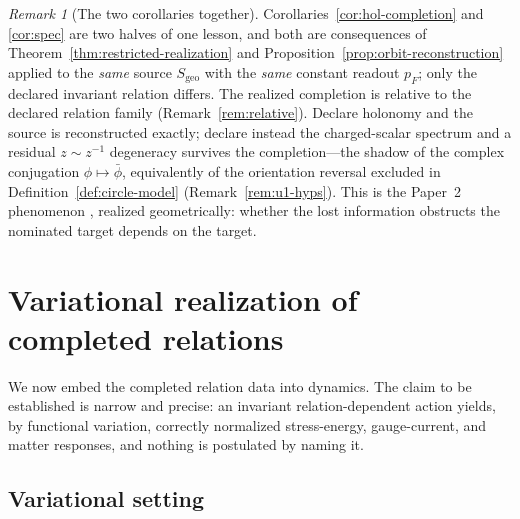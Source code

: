 \documentclass[11pt,a4paper]{article}
\theoremstyle{plain}
\theoremstyle{definition}
\theoremstyle{remark}
\newtheorem{remark}[theorem]{Remark}
\newcommand{\Sgeo}{S_{\mathrm{geo}}}
\begin{document}
\begin{remark}[The two corollaries together]
\label{rem:two-corollaries}
Corollaries~\ref{cor:hol-completion} and \ref{cor:spec} are two halves of one lesson, and both are
consequences of Theorem~\ref{thm:restricted-realization} and
Proposition~\ref{prop:orbit-reconstruction} applied to the \emph{same} source $\Sgeo$ with the
\emph{same} constant readout $p_F$; only the declared invariant relation differs. The realized
completion is relative to the declared relation family (Remark~\ref{rem:relative}). Declare holonomy
and the source is reconstructed exactly; declare instead the charged-scalar spectrum and a residual
$z\sim z^{-1}$ degeneracy survives the completion---the shadow of the complex conjugation
$\phi\mapsto\bar\phi$, equivalently of the orientation reversal excluded in
Definition~\ref{def:circle-model} (Remark~\ref{rem:u1-hyps}). This is the Paper~2 phenomenon
\cite{ST2}, realized geometrically: whether the lost information obstructs the nominated target
depends on the target.
\end{remark}

\section{Variational realization of completed relations}
\label{sec:variational}

We now embed the completed relation data into dynamics. The claim to be established is narrow and
precise: an invariant relation-dependent action yields, by functional variation, correctly
normalized stress-energy, gauge-current, and matter responses, and nothing is postulated by naming
it.

\subsection{Variational setting}
\end{document}

